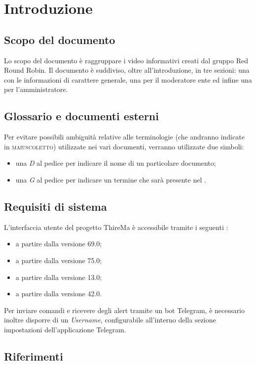 \section{Introduzione}
	\subsection{Scopo del documento}
		Lo scopo del documento è raggruppare i video informativi creati dal gruppo Red Round Robin. Il documento è suddiviso, oltre all'introduzione, in tre sezioni: una con le informazioni di carattere generale, una per il moderatore ente ed infine una per l'amministratore.	
	\subsection{Glossario e documenti esterni}
		Per evitare possibili ambiguità relative alle terminologie (che andranno indicate in \textsc{maiuscoletto}) utilizzate nei vari documenti, verranno utilizzate due simboli:
		\begin{itemize}
			\item una \textit{D} al pedice per indicare il nome di un particolare documento;
			\item una \textit{G} al pedice per indicare un termine che sarà presente nel .
		\end{itemize}
	\subsection{Requisiti di sistema}
		L'interfaccia utente del progetto ThireMa è accessibile tramite i seguenti :
		\begin{itemize}
		 	\item {} a partire dalla versione 69.0;
		 	\item {} a partire dalla versione 75.0;
		 	\item {} a partire dalla versione 13.0;
		 	\item {} a partire dalla versione 42.0.
		\end{itemize} 
		Per inviare comandi e ricevere degli alert tramite un bot Telegram, è necessario inoltre disporre di un \textit{Username}, configurabile all'interno della sezione impostazioni dell'applicazione Telegram.
	\subsection{Riferimenti}
